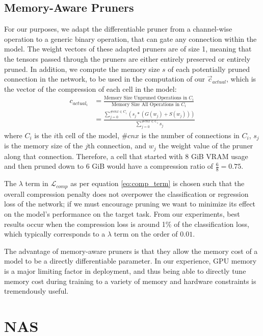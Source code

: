 \documentclass[10pt,twocolumn,letterpaper]{article}
\begin{document}
\subsection{Memory-Aware Pruners}
For our purposes, we adapt the differentiable pruner from a channel-wise operation to a generic binary operation, that can gate any connection within the model. The weight vectors of these adapted pruners are of size 1, meaning that the tensors passed through the pruners are either entirely preserved or entirely pruned.  In addition, we compute the memory size $s$ of each potentially pruned connection in the network, to be used in the computation of our $\vec{c}_{actual}$, which is the vector of the compression of each cell in the model:
\begin{align}
	c_{{actual}_i} &= \frac{\text{Memory Size Unpruned Operations in } C_i}{\text{Memory Size All Operations in } C_i} \\[.5em]
	&=  \frac{\sum\limits_{j=0}^{\# cnx \in C_i}{\left(s_j* (G(w_j) + S(w_j))\right)}}{\sum\limits_{j=0}^{\# cnx \in C_i}{s_j}} 
\end{align}
where $C_i$ is the $i$th cell of the model, $\# cnx$ is the number of connections in $C_i$, $s_j$ is the memory size of the $j$th connection, and $w_j$ the weight value of the pruner along that connection. Therefore, a cell that started with 8 GiB VRAM usage and then pruned down to 6 GiB would have a compression ratio of $\frac{6}{8} = 0.75$. 

The $\lambda$ term in $\mathcal{L}_{comp} $ as per equation \ref{eq:comp_term} is chosen such that the overall compression penalty does not overpower the classification or regression loss of the network; if we must encourage pruning we want to minimize its effect on the model's performance on the target task. From our experiments, best results occur when the compression loss is around 1\% of the classification loss, which typically corresponds to a  $\lambda$ term on the order of $0.01$.

The advantage of memory-aware pruners is that they allow the memory cost of a model to be a directly differentiable parameter. In our experience, GPU memory is a major limiting factor in deployment, and thus being able to directly tune memory cost during training to a variety of memory and hardware constraints is tremendously useful.

\section{NAS}
\end{document}

